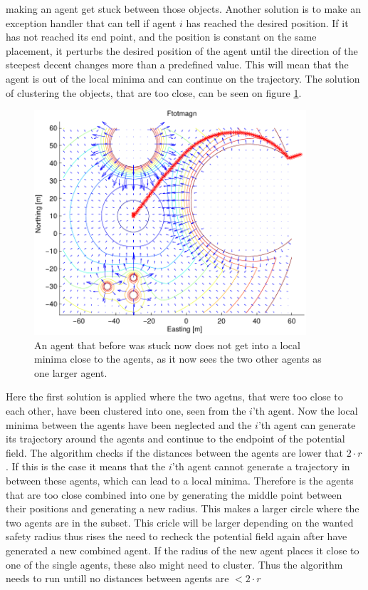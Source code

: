making an agent get stuck between those objects. Another solution is
to make an exception handler that can tell if agent $i$ has reached
the desired position. If it has not reached its end point, and the
position is constant on the same placement, it perturbs the desired
position of the agent until the direction of the steepest decent
changes more than a predefined value. This will mean that the agent is out of the local minima and can continue on the trajectory.
The solution of clustering the objects, that are too close, can be seen on figure \ref{fig:solroevproblem}.
\begin{figure}[htbp]
  \includegraphics[width=0.9\textwidth]{fig/ftotmagnfigpdf4}
  \caption{An agent that before was stuck now does not get into a local minima close to the agents, as it now sees the two other agents as one larger agent.}
  \label{fig:solroevproblem}
\end{figure}
Here the first solution is applied where the two agetns, that were too close to each other, have been clustered into one, seen from the $i$'th agent. Now the local minima between the agents have been neglected and the $i$'th agent can generate its trajectory around the agents and continue to the endpoint of the potential field. The algorithm checks if the distances between the agents are lower that $2 \cdot r$. If this is the case it means that the $i$'th agent cannot generate a trajectory in between these agents, which can lead to a local minima. Therefore is the agents that are too close combined into one by generating the middle point between their positions and generating a new radius. This makes a larger circle where the two agents are in the subset. This cricle will be larger depending on the wanted safety radius thus rises the need to recheck the potential field again after have generated a new combined agent. If the radius of the new agent places it close to one of the single agents, these also might need to cluster. Thus the algorithm needs to run untill no distances between agents are $< 2 \cdot r$
